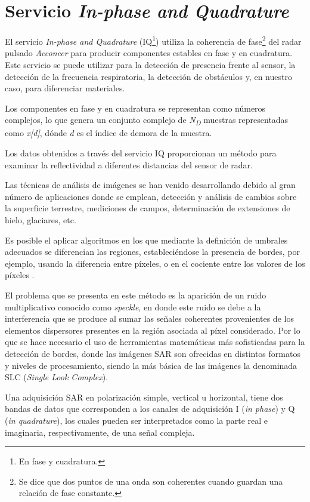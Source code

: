 \section{Servicio \textit{In-phase and Quadrature}}

El servicio \textit{In-phase and Quadrature} (IQ\footnote{En fase y cuadratura.}) utiliza la coherencia de fase\footnote{Se dice que dos puntos de una onda son coherentes cuando guardan una relación de fase constante.} del radar pulsado \textit{Acconeer} para producir componentes estables en fase y en cuadratura. Este servicio se puede utilizar para la detección de presencia frente al sensor, la detección de la frecuencia respiratoria, la detección de obstáculos y, en nuestro caso, para diferenciar materiales.

Los componentes en fase y en cuadratura se representan como números complejos, lo que genera un conjunto complejo de \textit{N\textsubscript{D}} muestras representadas como \textit{x[d]}, dónde \textit{d} es el índice de demora de la muestra.

Los datos obtenidos a través del servicio IQ proporcionan un método para examinar la reflectividad a diferentes distancias del sensor de radar.

Las técnicas de análisis de imágenes se han venido desarrollando debido al gran número de aplicaciones donde se emplean, detección y análisis de cambios sobre la superficie terrestre, mediciones de campos, determinación de extensiones de hielo, glaciares, etc.

Es posible el aplicar algoritmos en los que mediante la definición de umbrales adecuados se diferencian las regiones, estableciéndose la presencia de bordes, por ejemplo, usando la diferencia entre píxeles, o en el cociente entre los valores de los píxeles \cite{Varela2019}.

El problema que se presenta en este método es la aparición de un ruido multiplicativo conocido como \textit{speckle}, en donde este ruido se debe a la interferencia que se produce al sumar las señales coherentes provenientes de los elementos dispersores presentes en la región asociada al píxel considerado. Por lo que se hace necesario el uso de herramientas matemáticas más sofisticadas para la detección de bordes, donde las imágenes SAR son ofrecidas en distintos formatos y niveles de procesamiento, siendo la más básica de las imágenes la denominada SLC (\textit{Single Look Complex}). 

Una adquisición SAR en polarización simple, vertical u horizontal, tiene dos bandas de datos que corresponden a los canales de adquisición I (\textit{in phase}) y Q (\textit{in quadrature}), los cuales pueden ser interpretados como la parte real e imaginaria, respectivamente, de una señal compleja.

